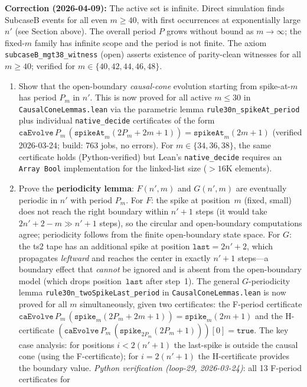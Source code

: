 \documentclass[11pt]{article}
\theoremstyle{plain}
\theoremstyle{definition}
\begin{document}
\textbf{Correction (2026-04-09):} The active set is infinite.
Direct simulation finds SubcaseB events for all even $m \geq 40$, with first occurrences
at exponentially large $n'$ (see Section above).  The overall period $P$ grows without bound
as $m \to \infty$; the fixed-$m$ family has infinite scope and the period is not finite.
The axiom \texttt{subcaseB\_mgt38\_witness} (open) asserts existence of parity-clean witnesses
for all $m \geq 40$; verified for $m \in \{40,42,44,46,48\}$.
\begin{enumerate}
\item Show that the open-boundary \emph{causal-cone} evolution starting from
  spike-at-$m$ has period $P_m$ in $n'$.  This is now proved for all active
  $m \leq 30$ in \texttt{CausalConeLemmas.lean} via the parametric lemma
  \texttt{rule30n\_spikeAt\_period} plus individual \texttt{native\_decide}
  certificates of the form $\texttt{caEvolve}\,P_m\,(\texttt{spikeAt}_m(2P_m{+}2m{+}1)) = \texttt{spikeAt}_m(2m{+}1)$
  (verified 2026-03-24; build: 763 jobs, no errors).
  For $m \in \{34,36,38\}$, the same certificate holds (Python-verified)
  but Lean's \texttt{native\_decide} requires an \texttt{Array Bool} implementation
  for the linked-list size ($>16$K elements).
\item Prove the \textbf{periodicity lemma}: $F(n',m)$ and $G(n',m)$ are
  eventually periodic in $n'$ with period $P_m$.  For $F$: the spike at
  position~$m$ (fixed, small) does not reach the right boundary within
  $n'+1$ steps (it would take $2n'+2-m \gg n'+1$ steps), so the circular
  and open-boundary computations agree; periodicity follows from the
  finite open-boundary state space.  For $G$: the ts2 tape has an additional
  spike at position $\mathtt{last} = 2n'+2$, which propagates \emph{leftward}
  and reaches the center in exactly $n'+1$ steps---a boundary effect that
  \emph{cannot} be ignored and is absent from the open-boundary model
  (which drops position~$\mathtt{last}$ after step~1).
  The general $G$-periodicity lemma \texttt{rule30n\_twoSpikeLast\_period} in
  \texttt{CausalConeLemmas.lean} is now proved for all $m$ simultaneously,
  given two certificates: the F-period certificate
  $\texttt{caEvolve}\,P_m\,(\texttt{spike}_m(2P_m{+}2m{+}1)) = \texttt{spike}_m(2m{+}1)$
  and the H-certificate
  $(\texttt{caEvolve}\,P_m\,(\texttt{spike}_{2P_m}(2P_m{+}1)))[0] = \mathtt{true}$.
  The key case analysis: for positions $i < 2(n'+1)$ the last-spike is outside the
  causal cone (using the F-certificate); for $i = 2(n'+1)$ the H-certificate provides
  the boundary value.  \emph{Python verification (loop-29, 2026-03-24)}: all 13 F-period certificates for

\end{enumerate}
\end{document}
